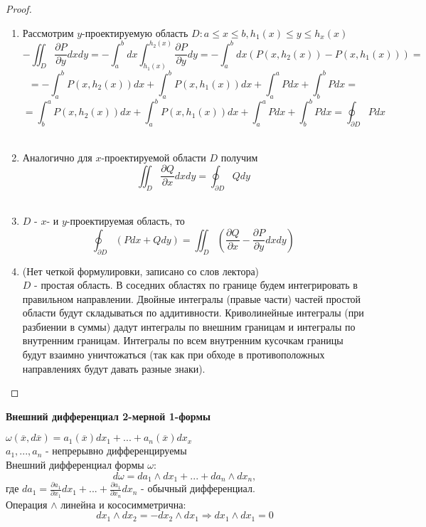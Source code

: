     \begin{proof}
    
    \begin{enumerate}
        \item 
        Рассмотрим $y$-проектируемую область $D: a \leq x \leq b, h_1(x) \leq y \leq h_x(x)$\\
        $$-\iint_D \frac{\partial P}{\partial y} dxdy = 
        -\int_a^b dx \int_{h_1(x)}^{h_2(x)}\frac{\partial P}{\partial y}dy =
        -\int_a^b dx (P(x, h_2(x)) - P(x, h_1(x))) = $$
        $$= -\int_a^bP(x, h_2(x))dx + \int_a^b P(x, h_1(x))dx + \int_a^a Pdx + \int_b^b Pdx = $$
        $$= \int_b^aP(x, h_2(x))dx + \int_a^b P(x, h_1(x))dx + \int_a^a Pdx + \int_b^b Pdx = 
        \oint_{\partial D} Pdx$$\\
        \item
        Аналогично для $x$-проектируемой области $D$ получим\\
        $$\iint_D\frac{\partial Q}{\partial x}dxdy = \oint_{\partial D} Q dy$$\\
        \item
        $D$ - $x$- и $y$-проектируемая область, то \\
        $$\oint_{\partial D}(Pdx + Qdy) = \iint_D (\frac{\partial Q}{\partial x} - \frac{\partial P}{\partial y}dxdy)$$
        \item (Нет четкой формулировки, записано со слов лектора)\\
        $D$ - простая область. В соседних областях по границе будем интегрировать в правильном направлении. Двойные интегралы (правые части) частей простой области будут складываться по аддитивности. Криволинейные интегралы (при разбиении в суммы) дадут интегралы по внешним границам и интегралы по внутренним границам. Интегралы по всем внутренним кусочкам границы будут взаимно уничтожаться (так как при обходе в противоположных направлениях будут давать разные знаки).
    \end{enumerate}
    
    \end{proof}
    
    \begin{center}
        \textbf{Внешний дифференциал 2-мерной 1-формы}
    \end{center}
    $\omega(\overline{x}, d\overline{x}) = a_1(\overline{x})dx_1 + ... + a_n(\overline{x})dx_x$\\
    $a_1, ..., a_n$ - непрерывно дифференцируемы\\
    Внешний дифференциал формы $\omega$:\\
    $$d\omega = da_1 \wedge dx_1 + ... + da_n \wedge dx_n,$$
    где $da_1 = \frac{\partial a_1}{\partial x_1} dx_1 + ... + \frac{\partial a_1}{\partial x_n}dx_n$ - обычный дифференциал.\\
    Операция $\wedge$ линейна и кососимметрична:\\
    $$dx_1 \wedge dx_2 = - dx_2 \wedge dx_1 \Rightarrow dx_1 \wedge dx_1 = 0$$\\
    
